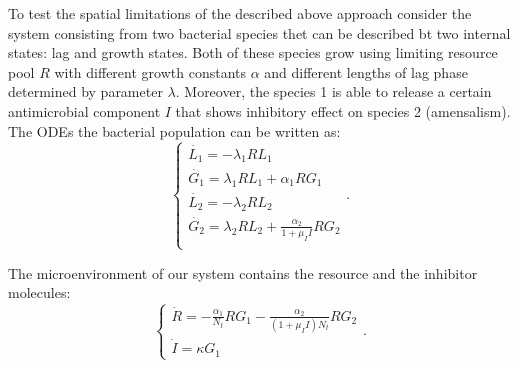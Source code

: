 \documentclass[10pt,A4paper]{article}
\begin{document}


To test the spatial limitations of the described above approach consider the system consisting from two bacterial species thet can be described bt two internal states: lag and growth states. 
Both of these species grow using limiting resource pool $R$ with different growth constants $\alpha$ and different lengths of lag phase determined by parameter $\lambda$.
Moreover, the species 1 is able to release a certain antimicrobial component $I$ that shows inhibitory effect on species 2 (amensalism).
The ODEs the bacterial population can be written as: 
\begin{equation}
    \begin{cases}
        \dot{L_1} = -\lambda_1 R L_1\\
        \dot{G_1} = \lambda_1 R L_1 + \alpha_1 R G_1\\
        \dot{L_2} = -\lambda_2 R L_2\\
        \dot{G_2} = \lambda_2 R L_2 + \frac{\alpha_2}{1 + \mu_I I} R G_2\\
    \end{cases}.
    \label{eq:spatial_limit_F}
\end{equation}

The microenvironment of our system contains the resource and the inhibitor molecules:
\begin{equation}
    \begin{cases}
        \dot{R} = -\frac{\alpha_1}{N_t} R G_1-\frac{\alpha_2}{(1 + \mu_I I) N_t} R G_2 \\
        \dot{I} = \kappa G_1
    \end{cases}.
    \label{eq:spatial_limit_H}
\end{equation}
\end{document}
